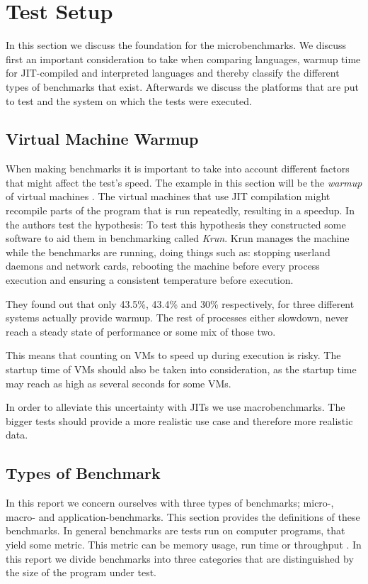 \section{Test Setup}
In this section we discuss the foundation for the microbenchmarks. We discuss first an important consideration to take when comparing languages, warmup time for \ac{JIT}-compiled and interpreted languages and thereby classify the different types of benchmarks that exist. Afterwards we discuss the platforms that are put to test and the system on which the tests were executed.

\subsection{Virtual Machine Warmup}\label{sec:sub:vmwarmup}
When making benchmarks it is important to take into account different factors that might affect the test's speed.
The example in this section will be the \textit{warmup} of virtual machines \cite{vmwarmup}.
The virtual machines that use \ac{JIT} compilation might recompile parts of the program that is run repeatedly, resulting in a speedup.
In \cite{vmwarmup} the authors test the hypothesis: 
To test this hypothesis they constructed some software to aid them in benchmarking called \textit{Krun}.
Krun manages the machine while the benchmarks are running, doing things such as: stopping userland daemons and network cards, rebooting the machine before every process execution and ensuring a consistent temperature before execution.

They found out that only 43.5\%, 43.4\% and 30\% respectively, for three different systems actually provide  warmup. The rest of processes either slowdown, never reach a steady state of performance or some mix of those two.

This means that counting on \acs{VM}s to speed up during execution is risky.
The startup time of \acs{VM}s should also be taken into consideration, as the startup time may reach as high as several seconds for some \acs{VM}s.

In order to alleviate this uncertainty with \acs{JIT}s we use macrobenchmarks. The bigger tests should provide a more realistic use case and therefore more realistic data.

\subsection{Types of Benchmark}
In this report we concern ourselves with three types of benchmarks; micro-, macro- and application-benchmarks. This section provides the definitions of these benchmarks. In general benchmarks are tests run on computer programs, that yield some metric. This metric can be memory usage, run time or throughput \cite{Fleming:1986:LSC:5666.5673}. In this report we divide benchmarks into three categories that are distinguished by the size of the program under test.

